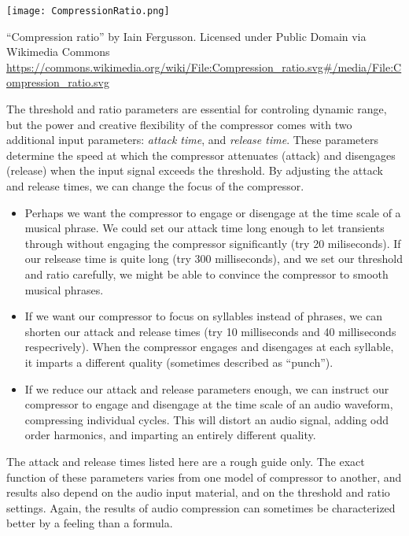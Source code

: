 \begin{marginfigure}
  \texttt{[image: CompressionRatio.png]}
  \caption{``Compression ratio'' by Iain Fergusson. Licensed under
     Public Domain via Wikimedia Commons 
     \url{https://commons.wikimedia.org/wiki/File:Compression_ratio.svg\#/media/File:Compression_ratio.svg}
   }
  \label{fig:comp-ratio}
\end{marginfigure}

The threshold and ratio parameters are essential for controling dynamic
range, but the power and creative flexibility of the compressor comes
with two additional input parameters: \textit{attack time}, and
\textit{release time}. These parameters determine the speed at which
the compressor attenuates (attack) and disengages (release) when the
input signal exceeds the threshold. By adjusting the attack and
release times, we can change the focus of the compressor.
\begin{itemize}
\item Perhaps we want the compressor to engage or disengage at the
  time scale of a musical phrase. We could set our attack time long
  enough to let transients through without engaging the compressor
  significantly (try 20 miliseconds). If our relsease time is quite
  long (try 300 milliseconds), and we set our threshold and ratio
  carefully, we might be able to convince the compressor to smooth
  musical phrases.
\item If we want our compressor to focus on syllables instead of
  phrases, we can shorten our attack and release times (try 10
  milliseconds and 40 milliseconds respecrively). When the compressor
  engages and disengages at each syllable, it imparts a different
  quality (sometimes described as ``punch'').
\item If we reduce our attack and release parameters enough, we can
  instruct our compressor to engage and disengage at the time scale of
  an audio waveform, compressing individual cycles. This will distort
  an audio signal, adding odd order harmonics, and imparting an entirely different quality.
\end{itemize}
The attack and release times listed here are a rough guide only.  The
exact function of these parameters varies from one model of compressor
to another, and results also depend on the audio input material, and
on the threshold and ratio settings. Again, the results of audio
compression can sometimes be characterized better by a feeling than a
formula.

